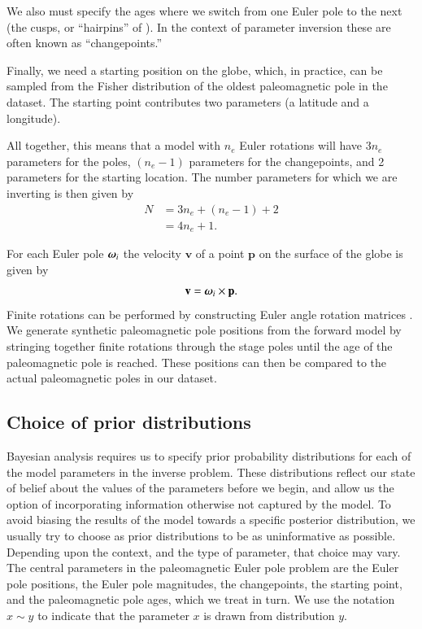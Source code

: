 \documentclass[preprint,12pt,authoryear]{elsarticle}
\newcommand{\mitbf}[1]{\hbox{\mathversion{bold}$#1$}}
\begin{document}
We also must specify the ages where we switch from 
one Euler pole to the next (the cusps, or ``hairpins'' of \citet{irving1972hairpins}).
In the context of parameter inversion these are often known as ``changepoints.''

Finally, we need a starting position on the globe, which, in practice, can be sampled
from the Fisher distribution of the oldest paleomagnetic pole in the dataset.
The starting point contributes two parameters (a latitude and a longitude).

All together, this means that a model with $n_e$ Euler rotations will
have $3 n_e$ parameters for the poles, $(n_e-1)$ parameters for the changepoints,
and 2 parameters for the starting location.
The number parameters for which we are inverting is then given by
\begin{equation}
\begin{aligned}
N &= 3 n_e + (n_e -1) + 2 \\
 &= 4 n_e + 1.
\end{aligned}
\label{eq:n_parameters}
\end{equation}

For each Euler pole $\mitbf{\omega}_i$ the velocity $\mathbf{v}$ of a point 
$\mathbf{p}$ on the surface of the globe is given by
\begin{equation}
\mathbf{v} = \mitbf{\omega}_i \times \mathbf{p}.
\label{eq:rigid_rotation}
\end{equation}
Finite rotations can be performed by constructing Euler angle rotation matrices \citep[cf.][]{goldstein1965classical}. 
We generate synthetic paleomagnetic pole positions from the forward model by stringing together
finite rotations through the stage poles until the age of the paleomagnetic pole
is reached. These positions can then be compared to the actual paleomagnetic poles in our dataset.

\subsection{Choice of prior distributions}
\label{sec:priors}

Bayesian analysis requires us to specify prior probability distributions 
for each of the model parameters in the inverse problem.
These distributions reflect our state of belief about the values of the parameters before we begin,
and allow us the option of incorporating information otherwise not captured by the model.
To avoid biasing the results of the model towards a specific posterior distribution,
we usually try to choose as prior distributions to be as uninformative as possible. 
Depending upon the context, and the type of parameter, that choice may vary.
The central parameters in the paleomagnetic Euler pole problem are the Euler pole positions,
the Euler pole magnitudes, the changepoints, the starting point, and the paleomagnetic pole ages, which we treat in turn.
We use the notation $x \sim y$ to indicate that the parameter $x$ is drawn from distribution $y$.
\end{document}
